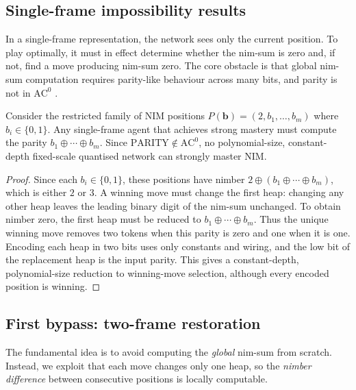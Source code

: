 \documentclass[twoside,11pt]{article}
\newcommand{\AC}{\mathrm{AC}}
\numberwithin{theorem}{section}
\numberwithin{equation}{section}
\begin{document}
\subsection{Single-frame impossibility results}
\label{sec:impossibility}

In a single-frame representation, the network sees only the current position. To play optimally, it must in effect determine whether the nim-sum is zero and, if not, find a move producing nim-sum zero. The core obstacle is that global nim-sum computation requires parity-like behaviour across many bits, and parity is not in $\AC^0$ \citep{furst1984parity,hastad1986thesis,smolensky1987algebraic,razborov1987lower}.

\begin{theorem}
\label{thm:singleframe-impossible}
Consider the restricted family of NIM positions $P(\mathbf{b})=(2,b_1,\dots,b_m)$ where $b_i\in\{0,1\}$.
Any single-frame agent that achieves strong mastery must compute the parity $b_1\oplus\cdots\oplus b_m$.
Since $\mathrm{PARITY}\notin \AC^0$, no polynomial-size, constant-depth fixed-scale quantised network can strongly master NIM.
\end{theorem}

\begin{proof}
Since each $b_i\in\{0,1\}$, these positions have nimber $2\oplus(b_1\oplus\cdots\oplus b_m)$, which is either $2$ or $3$. A winning move must change the first heap: changing any other heap leaves the leading binary digit of the nim-sum unchanged. To obtain nimber zero, the first heap must be reduced to $b_1\oplus\cdots\oplus b_m$. Thus the unique winning move removes two tokens when this parity is zero and one when it is one.
Encoding each heap in two bits uses only constants and wiring, and the low bit of the replacement heap is the input parity. This gives a constant-depth, polynomial-size reduction to winning-move selection, although every encoded position is winning.
\end{proof}



\subsection{First bypass: two-frame restoration}
\label{sec:multiframe}

The fundamental idea is to avoid computing the \emph{global} nim-sum from scratch. Instead, we exploit that each move changes only one heap, so the \emph{nimber difference} between consecutive positions is locally computable.
\end{document}
